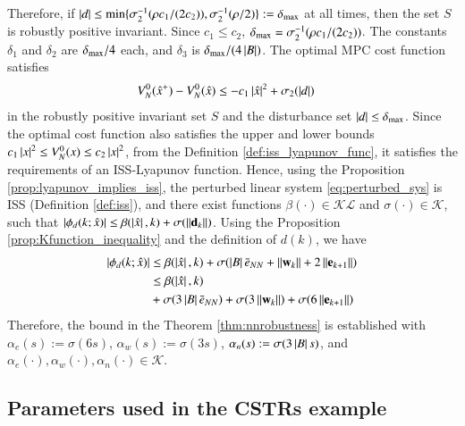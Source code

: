 \documentclass[preprint,5p, twocolumn, authoryear]{elsarticle}
\begin{document}
Therefore, if $\left| d \right| \leq \textnormal{min} \{ \sigma_2^{-1}(\rho c_1/(2c_2)),
\sigma_2^{-1}(\rho/2)\} := \delta_{\textnormal{max}}$ at all times, then the set
$S$ is robustly positive invariant. Since $c_1 \leq c_2$,
$\delta_{\textnormal{max}} = \sigma_2^{-1}(\rho c_1/(2c_2))$. The constants
$\delta_1$ and $\delta_2$ are $\delta_{\textnormal{max}}/4$ each, and $\delta_3$
is $\delta_{\textnormal{max}}/(4\left| B \right|)$. The optimal MPC cost function
satisfies
\begin{align*}
    V_N^0(\hat{x}^+) - V_N^0(\hat{x}) &\leq 
    -c_1\left| \hat{x} \right|^2 + \sigma_2(\left| d \right|)
\end{align*}
in the robustly positive invariant set $S$ and the disturbance set $\left| d \right|
\leq \delta_{\textnormal{max}}$. Since the optimal cost function also satisfies
the upper and lower bounds $c_1\left| x \right|^2 \leq V_N^0(x) \leq c_2\left| x \right|^2$,
from the Definition \ref{def:iss_lyapunov_func}, it satisfies the requirements
of an ISS-Lyapunov function. Hence, using the Proposition
\ref{prop:lyapunov_implies_iss}, the perturbed linear system
\eqref{eq:perturbed_sys} is ISS (Definition \ref{def:iss}), and there exist
functions $\beta(\cdot) \in \mathcal{K}\mathcal{L}$ and $\sigma(\cdot) \in
\mathcal{K}$, such that $\left| \phi_d(k; \hat{x}) \right| \leq \beta(\left| \hat{x} \right|, k) +
\sigma(\left| \left| \mathbf{d}_k \right| \right|)$. Using the Proposition
\ref{prop:Kfunction_inequality} and the definition of $d(k)$, we have 
\begin{align*}
    \left| \phi_d(k; \hat{x}) \right| & \leq \beta(\left| \hat{x} \right|, k)
    + \sigma(\left| B \right|\bar{e}_{NN} + \left| \left| \mathbf{w}_k \right| \right|
    + 2\left| \left| \mathbf{e}_{k+1} \right| \right|) \\
     & \leq \beta(\left| \hat{x} \right|, k) \\
    & +\sigma(3\left| B \right|\bar{e}_{NN}) + 
    \sigma(3\left| \left| \mathbf{w}_k \right| \right|)
    + \sigma(6\left| \left| \mathbf{e}_{k+1} \right| \right|)
\end{align*}
Therefore, the bound in the Theorem \ref{thm:nnrobustness} is established with
$\alpha_e(s) := \sigma(6s)$, $\alpha_w(s) := \sigma(3s)$, $\alpha_n(s) :=
\sigma(3\left| B \right| s)$, and $\alpha_e(\cdot), \alpha_w(\cdot), \alpha_n(\cdot) \in
\mathcal{K}$.

\subsection{Parameters used in the CSTRs example} \label{app:cstrs_pars}
\end{document}

